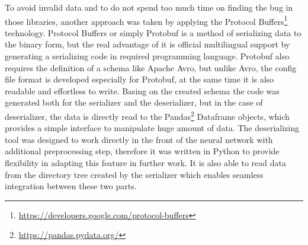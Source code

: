To avoid invalid data and to do not spend too much time on finding the bug in those libraries, another approach was taken by applying the Protocol Buffers\footnote{\url{https://developers.google.com/protocol-buffers}} technology.
Protocol Buffers or simply Protobuf is a method of serializing data to the binary form, but the real advantage of it is official multilingual support by generating a serializing code in required programming language.
Protobuf also requires the definition of a schema like Apache Avro, but unlike Avro, the config file format is developed especially for Protobuf, at the same time it is also readable and effortless to write.
Basing on the created schema the code was generated both for the serializer and the deserializer, but in the case of deserializer, the data is directly read to the Pandas\footnote{\url{https://pandas.pydata.org/}} Dataframe objects, which provides a simple interface to manipulate huge amount of data.
The deserializing tool was designed to work directly in the front of the neural network with additional preprocessing step, therefore it was written in Python to provide flexibility in adapting this feature in further work.
It is also able to read data from the directory tree created by the serializer which enables seamless integration between these two parts.